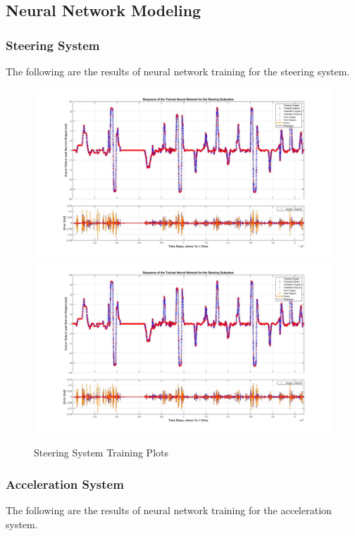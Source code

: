 \documentclass[journal,twoside,web]{ieeecolor}
\begin{document}
\subsection{Neural Network Modeling}
\label{sec:NN-Modeling}

\subsubsection{Steering System}

The following are the results of neural network training for the steering system.

\begin{figure}[htbp]
	\centering
		{\includegraphics[width=0.48\linewidth]{figs/img/steeringNeuralNetworkTrainedOutput}}
		{\includegraphics[width=0.48\linewidth]{figs/img/steeringNeuralNetworkTrainedOutput}}
	\caption{Steering System Training Plots}
\end{figure}


\subsubsection{Acceleration System}

The following are the results of neural network training for the acceleration system.
\end{document}
